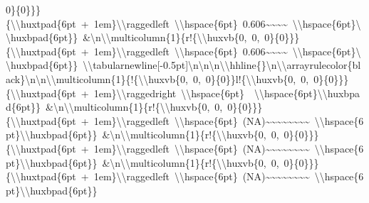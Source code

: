 \documentclass[
  english,
  man]{apa6}
\begin{document}
0\}\{0\}\}\}\{\textbackslash{}\textbackslash{}huxtpad\{6pt\ +\ 1em\}\textbackslash{}\textbackslash{}raggedleft\ \textbackslash{}\textbackslash{}hspace\{6pt\}\ 0.606\textasciitilde{}\textasciitilde{}\textasciitilde{}\textasciitilde{}\ \textbackslash{}\textbackslash{}hspace\{6pt\}\textbackslash{}\textbackslash{}huxbpad\{6pt\}\}\ \&\textbackslash{}n\textbackslash{}\textbackslash{}multicolumn\{1\}\{r!\{\textbackslash{}\textbackslash{}huxvb\{0,\ 0,\ 0\}\{0\}\}\}\{\textbackslash{}\textbackslash{}huxtpad\{6pt\ +\ 1em\}\textbackslash{}\textbackslash{}raggedleft\ \textbackslash{}\textbackslash{}hspace\{6pt\}\ 0.606\textasciitilde{}\textasciitilde{}\textasciitilde{}\textasciitilde{}\ \textbackslash{}\textbackslash{}hspace\{6pt\}\textbackslash{}\textbackslash{}huxbpad\{6pt\}\}\ \textbackslash{}\textbackslash{}tabularnewline{[}-0.5pt{]}\textbackslash{}n\textbackslash{}n\textbackslash{}n\textbackslash{}\textbackslash{}hhline\{\}\textbackslash{}n\textbackslash{}\textbackslash{}arrayrulecolor\{black\}\textbackslash{}n\textbackslash{}n\textbackslash{}\textbackslash{}multicolumn\{1\}\{!\{\textbackslash{}\textbackslash{}huxvb\{0,\ 0,\ 0\}\{0\}\}l!\{\textbackslash{}\textbackslash{}huxvb\{0,\ 0,\ 0\}\{0\}\}\}\{\textbackslash{}\textbackslash{}huxtpad\{6pt\ +\ 1em\}\textbackslash{}\textbackslash{}raggedright\ \textbackslash{}\textbackslash{}hspace\{6pt\}\ \ \textbackslash{}\textbackslash{}hspace\{6pt\}\textbackslash{}\textbackslash{}huxbpad\{6pt\}\}\ \&\textbackslash{}n\textbackslash{}\textbackslash{}multicolumn\{1\}\{r!\{\textbackslash{}\textbackslash{}huxvb\{0,\ 0,\ 0\}\{0\}\}\}\{\textbackslash{}\textbackslash{}huxtpad\{6pt\ +\ 1em\}\textbackslash{}\textbackslash{}raggedleft\ \textbackslash{}\textbackslash{}hspace\{6pt\}\ (NA)\textasciitilde{}\textasciitilde{}\textasciitilde{}\textasciitilde{}\textasciitilde{}\textasciitilde{}\textasciitilde{}\textasciitilde{}\ \textbackslash{}\textbackslash{}hspace\{6pt\}\textbackslash{}\textbackslash{}huxbpad\{6pt\}\}\ \&\textbackslash{}n\textbackslash{}\textbackslash{}multicolumn\{1\}\{r!\{\textbackslash{}\textbackslash{}huxvb\{0,\ 0,\ 0\}\{0\}\}\}\{\textbackslash{}\textbackslash{}huxtpad\{6pt\ +\ 1em\}\textbackslash{}\textbackslash{}raggedleft\ \textbackslash{}\textbackslash{}hspace\{6pt\}\ (NA)\textasciitilde{}\textasciitilde{}\textasciitilde{}\textasciitilde{}\textasciitilde{}\textasciitilde{}\textasciitilde{}\textasciitilde{}\ \textbackslash{}\textbackslash{}hspace\{6pt\}\textbackslash{}\textbackslash{}huxbpad\{6pt\}\}\ \&\textbackslash{}n\textbackslash{}\textbackslash{}multicolumn\{1\}\{r!\{\textbackslash{}\textbackslash{}huxvb\{0,\ 0,\ 0\}\{0\}\}\}\{\textbackslash{}\textbackslash{}huxtpad\{6pt\ +\ 1em\}\textbackslash{}\textbackslash{}raggedleft\ \textbackslash{}\textbackslash{}hspace\{6pt\}\ (NA)\textasciitilde{}\textasciitilde{}\textasciitilde{}\textasciitilde{}\textasciitilde{}\textasciitilde{}\textasciitilde{}\textasciitilde{}\ \textbackslash{}\textbackslash{}hspace\{6pt\}\textbackslash{}\textbackslash{}huxbpad\{6pt\}\}\ 
\end{document}
